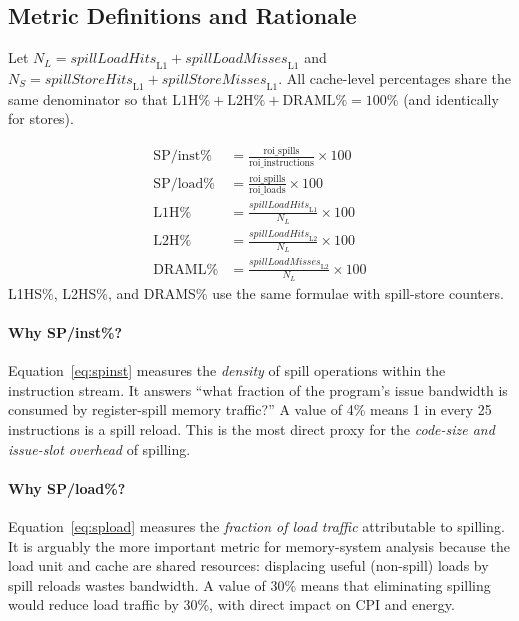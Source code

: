 \documentclass[11pt,a4paper]{article}
\begin{document}
\subsection{Metric Definitions and Rationale}
\label{subsec:metrics}

Let $N_L = \textit{spillLoadHits}_\text{L1} + \textit{spillLoadMisses}_\text{L1}$ and
$N_S = \textit{spillStoreHits}_\text{L1} + \textit{spillStoreMisses}_\text{L1}$.
All cache-level percentages share the same denominator so that
$\text{L1H\%}+\text{L2H\%}+\text{DRAML\%} = 100\%$
(and identically for stores).

\begin{align}
\text{SP/inst\%}  &= \frac{\text{roi\_spills}}{\text{roi\_instructions}} \times 100
\label{eq:spinst}\\
\text{SP/load\%}  &= \frac{\text{roi\_spills}}{\text{roi\_loads}} \times 100
\label{eq:spload}\\
\text{L1H\%}  &= \frac{\textit{spillLoadHits}_\text{L1}}{N_L} \times 100
\label{eq:l1h}\\
\text{L2H\%}  &= \frac{\textit{spillLoadHits}_\text{L2}}{N_L} \times 100
\label{eq:l2h}\\
\text{DRAML\%}&= \frac{\textit{spillLoadMisses}_\text{L2}}{N_L} \times 100
\label{eq:draml}
\end{align}
L1HS\%, L2HS\%, and DRAMS\% use the same formulae with spill-store counters.

\paragraph{Why SP/inst\%?}
Equation~\eqref{eq:spinst} measures the \emph{density} of spill
operations within the instruction stream.  It answers ``what fraction
of the program's issue bandwidth is consumed by register-spill memory
traffic?''  A value of 4\% means 1 in every 25 instructions is a
spill reload.  This is the most direct proxy for the \emph{code-size
and issue-slot overhead} of spilling.

\paragraph{Why SP/load\%?}
Equation~\eqref{eq:spload} measures the \emph{fraction of load traffic}
attributable to spilling.  It is arguably the more important metric
for memory-system analysis because the load unit and cache are shared
resources: displacing useful (non-spill) loads by spill reloads
wastes bandwidth.  A value of 30\% means that eliminating spilling
would reduce load traffic by 30\%, with direct impact on CPI and
energy.
\end{document}
